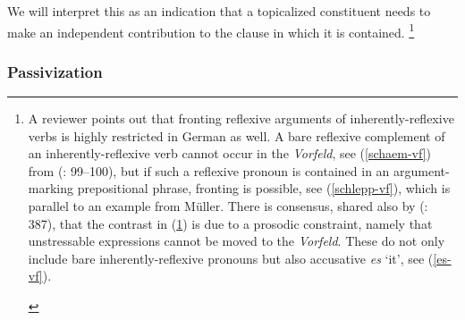\documentclass[output=paper]{langsci/langscibook}
\begin{document}
We will interpret this as an indication that a  topicalized constituent needs to make an independent contribution to the clause in which it is contained.%
\footnote{A reviewer points out that fronting reflexive arguments of inherently-reflexive verbs is highly restricted in  German as well. A bare reflexive complement of an inherently-reflexive verb cannot occur in the \textit{Vorfeld}, see (\ref{schaem-vf}) from \citeauthor{Mueller:99} (\citeyear{Mueller:99}: 99--100), but if such a reflexive pronoun is contained in an argument-marking prepositional phrase, fronting is possible, see (\ref{schlepp-vf}), which is parallel to an example from M\"uller. There is consensus, shared also by \citeauthor{Mueller:99} (\citeyear{Mueller:99}: 387), that the contrast in (\ref{sich-vf}) is due to a prosodic constraint, namely that unstressable expressions cannot be moved to the \textit{Vorfeld}. These do not only include bare inherently-reflexive pronouns but also accusative \textit{es} `it', see (\ref{es-vf}).

\begin{exe}
\ex\label{sich-vf}
\begin{xlist}
\end{xlist}
\end{exe}

}
 

\subsubsection{Passivization}
\end{document}
